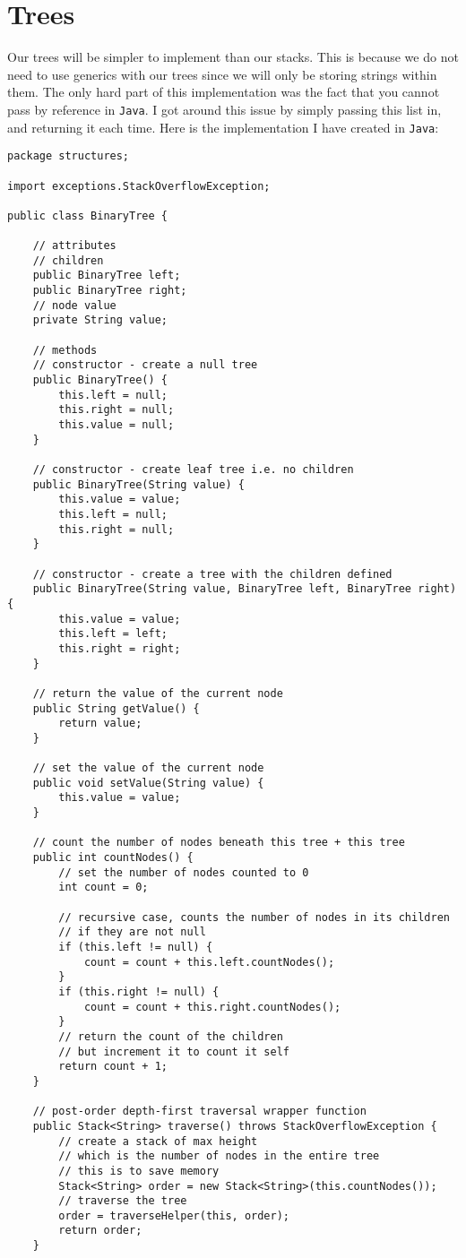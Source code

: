 \documentclass[../../../../main.tex]{subfiles}
\begin{document}
\section{Trees}
Our trees will be simpler to implement than our stacks. This is because we do not need to use generics with our trees since we will only be storing strings within them. The only hard part of this implementation was the fact that you cannot pass by reference\cite{byRefJava} in \texttt{Java}. I got around this issue by simply passing this list in, and returning it each time. Here is the implementation I have created in \texttt{Java}:
\begin{verbatim}
package structures;

import exceptions.StackOverflowException;

public class BinaryTree {

	// attributes
	// children
	public BinaryTree left;
	public BinaryTree right;
	// node value
	private String value;

	// methods
	// constructor - create a null tree
	public BinaryTree() {
		this.left = null;
		this.right = null;
		this.value = null;
	}

	// constructor - create leaf tree i.e. no children
	public BinaryTree(String value) {
		this.value = value;
		this.left = null;
		this.right = null;
	}

	// constructor - create a tree with the children defined
	public BinaryTree(String value, BinaryTree left, BinaryTree right) {
		this.value = value;
		this.left = left;
		this.right = right;
	}

	// return the value of the current node
	public String getValue() {
		return value;
	}

	// set the value of the current node
	public void setValue(String value) {
		this.value = value;
	}

	// count the number of nodes beneath this tree + this tree
	public int countNodes() {
		// set the number of nodes counted to 0
		int count = 0;

		// recursive case, counts the number of nodes in its children
		// if they are not null
		if (this.left != null) {
			count = count + this.left.countNodes();
		}
		if (this.right != null) {
			count = count + this.right.countNodes();
		}
		// return the count of the children
		// but increment it to count it self
		return count + 1;
	}

	// post-order depth-first traversal wrapper function
	public Stack<String> traverse() throws StackOverflowException {
		// create a stack of max height
		// which is the number of nodes in the entire tree
		// this is to save memory
		Stack<String> order = new Stack<String>(this.countNodes());
		// traverse the tree
		order = traverseHelper(this, order);
		return order;
	}


\end{verbatim}
\end{document}
